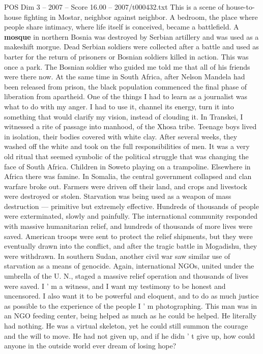 \begin{textsample}{POS Dim 3 – 2007 – Score 16.00 – 2007/t000432.txt}
This is a scene of house-to-house fighting in Mostar, neighbor against neighbor.
A bedroom, the place where people share intimacy, where life itself is conceived, became a battlefield.
A \textbf{mosque} in northern Bosnia was destroyed by Serbian artillery and was used as a makeshift morgue.
Dead Serbian soldiers were collected after a battle and used as barter for the return of prisoners or Bosnian soldiers killed in action.
This was once a park.
The Bosnian soldier who guided me told me that all of his friends were there now.
At the same time in South Africa, after Nelson Mandela had been released from prison, the black population commenced the final phase of liberation from apartheid.
One of the things I had to learn as a journalist was what to do with my anger.
I had to use it, channel its energy, turn it into something that would clarify my vision, instead of clouding it.
In Transkei, I witnessed a rite of passage into manhood, of the Xhosa tribe.
Teenage boys lived in isolation, their bodies covered with white clay.
After several weeks, they washed off the white and took on the full responsibilities of men.
It was a very old ritual that seemed symbolic of the political struggle that was changing the face of South Africa.
Children in Soweto playing on a trampoline.
Elsewhere in Africa there was famine.
In Somalia, the central government collapsed and clan warfare broke out.
Farmers were driven off their land, and crops and livestock were destroyed or stolen.
Starvation was being used as a weapon of mass destruction — primitive but extremely effective.
Hundreds of thousands of people were exterminated, slowly and painfully.
The international community responded with massive humanitarian relief, and hundreds of thousands of more lives were saved.
American troops were sent to protect the relief shipments, but they were eventually drawn into the conflict, and after the tragic battle in Mogadishu, they were withdrawn.
In southern Sudan, another civil war saw similar use of starvation as a means of genocide.
Again, international NGOs, united under the umbrella of the U.
N., staged a massive relief operation and thousands of lives were saved.
I ' m a witness, and I want my testimony to be honest and uncensored.
I also want it to be powerful and eloquent, and to do as much justice as possible to the experience of the people I ' m photographing.
This man was in an NGO feeding center, being helped as much as he could be helped.
He literally had nothing.
He was a virtual skeleton, yet he could still summon the courage and the will to move.
He had not given up, and if he didn ' t give up, how could anyone in the outside world ever dream of losing hope?

\end{textsample}
